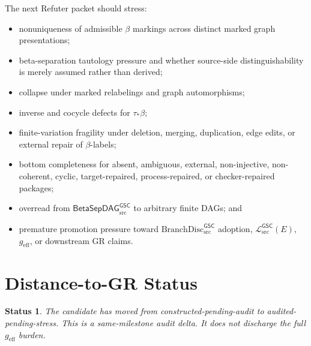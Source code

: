 \documentclass[11pt]{article}
\newcommand{\MetricData}{\mathcal{L}_{\mathrm{src}}^{\mathsf{GSC}}}
\newcommand{\geff}{g_{\mathrm{eff}}}
\newcommand{\BranchDisc}{\mathrm{BranchDisc}_{\mathrm{src}}^{\mathsf{GSC}}}
\newcommand{\BetaGraph}{\mathsf{BetaSepDAG}_{\mathrm{src}}^{\mathsf{GSC}}}
\newtheorem{status}{Status}
\begin{document}
The next Refuter packet should stress:
\begin{itemize}[leftmargin=*]
  \item nonuniqueness of admissible \(\beta\) markings across distinct marked
  graph presentations;
  \item beta-separation tautology pressure and whether source-side
  distinguishability is merely assumed rather than derived;
  \item collapse under marked relabelings and graph automorphisms;
  \item inverse and cocycle defects for \(\tau_\ast\beta\);
  \item finite-variation fragility under deletion, merging, duplication,
  edge edits, or external repair of \(\beta\)-labels;
  \item bottom completeness for absent, ambiguous, external, non-injective,
  non-coherent, cyclic, target-repaired, process-repaired, or checker-repaired
  packages;
  \item overread from \(\BetaGraph\) to arbitrary finite DAGs; and
  \item premature promotion pressure toward \(\BranchDisc\) adoption,
  \(\MetricData(E)\), \(\geff\), or downstream GR claims.
\end{itemize}

\section{Distance-to-GR Status}

\begin{status}
The candidate has moved from constructed-pending-audit to
audited-pending-stress. This is a same-milestone audit delta. It does not
discharge the full \(\geff\) burden.
\end{status}
\end{document}
